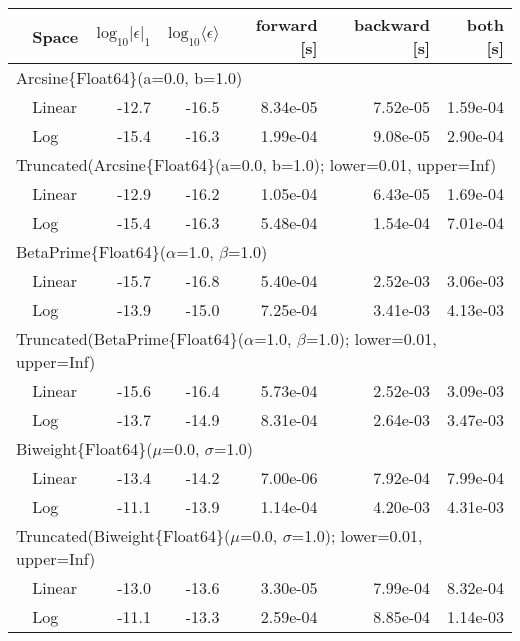 \begin{tabular}{|llrrrrr|} \hline
& Space & $\mbox{log}_{10}|\epsilon|_1$ & $\mbox{log}_{10}\langle\epsilon\rangle$ & forward [s] & backward [s] & both [s]\\ \hline
\multicolumn{7}{|l|}{Arcsine\{Float64\}(a=0.0, b=1.0)}\\ \hline
& Linear & -12.7 & {\color{blue}-16.5} & {\color{blue}8.34e-05} & {\color{blue}7.52e-05} & {\color{blue}1.59e-04}\\
& Log & {\color{blue}-15.4} & -16.3 & 1.99e-04 & 9.08e-05 & 2.90e-04\\
\hline
\multicolumn{7}{|l|}{Truncated(Arcsine\{Float64\}(a=0.0, b=1.0); lower=0.01, upper=Inf)}\\ \hline
& Linear & -12.9 & -16.2 & {\color{blue}1.05e-04} & {\color{blue}6.43e-05} & {\color{blue}1.69e-04}\\
& Log & {\color{blue}-15.4} & {\color{blue}-16.3} & 5.48e-04 & 1.54e-04 & 7.01e-04\\
\hline
\multicolumn{7}{|l|}{BetaPrime\{Float64\}($\alpha$=1.0, $\beta$=1.0)}\\ \hline
& Linear & {\color{blue}-15.7} & {\color{blue}-16.8} & {\color{blue}5.40e-04} & {\color{blue}2.52e-03} & {\color{blue}3.06e-03}\\
& Log & -13.9 & -15.0 & 7.25e-04 & 3.41e-03 & 4.13e-03\\
\hline
\multicolumn{7}{|l|}{Truncated(BetaPrime\{Float64\}($\alpha$=1.0, $\beta$=1.0); lower=0.01, upper=Inf)}\\ \hline
& Linear & {\color{blue}-15.6} & {\color{blue}-16.4} & {\color{blue}5.73e-04} & {\color{blue}2.52e-03} & {\color{blue}3.09e-03}\\
& Log & -13.7 & -14.9 & 8.31e-04 & 2.64e-03 & 3.47e-03\\
\hline
\multicolumn{7}{|l|}{Biweight\{Float64\}($\mu$=0.0, $\sigma$=1.0)}\\ \hline
& Linear & {\color{blue}-13.4} & {\color{blue}-14.2} & {\color{blue}7.00e-06} & {\color{blue}7.92e-04} & {\color{blue}7.99e-04}\\
& Log & -11.1 & -13.9 & 1.14e-04 & 4.20e-03 & 4.31e-03\\
\hline
\multicolumn{7}{|l|}{Truncated(Biweight\{Float64\}($\mu$=0.0, $\sigma$=1.0); lower=0.01, upper=Inf)}\\ \hline
& Linear & {\color{blue}-13.0} & {\color{blue}-13.6} & {\color{blue}3.30e-05} & {\color{blue}7.99e-04} & {\color{blue}8.32e-04}\\
& Log & -11.1 & -13.3 & 2.59e-04 & 8.85e-04 & 1.14e-03\\

\end{tabular}
